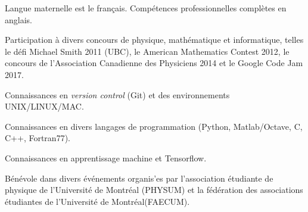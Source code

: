 \begin{cvletter}
{
  \begin{cvitems}
    \item{Langue maternelle est le fran\c{c}ais. Comp\'etences professionnelles compl\`etes en anglais.}
    \item{Participation \`a divers concours de physique, math\'ematique et informatique, telles le d\'efi Michael Smith 2011 (UBC), le American Mathematics Contest 2012, le concours de l'Association Canadienne des Physiciens 2014 et le Google Code Jam 2017.}
    \item{Connaissances en \textit{version control} (Git) et des environnements UNIX/LINUX/MAC.}
    \item{Connaissances en divers langages de programmation (Python, Matlab/Octave, C, C++, Fortran77).}
    \item{Connaissances en apprentissage machine et Tensorflow.}
    \item{B\'en\'evole dans divers \'ev\'enements organis'es par l'association \'etudiante de physique de l'Universit\'e de Montr\'eal (PHYSUM) et la f\'ed\'eration des associations \'etudiantes de l'Universit\'e de Montr\'eal(FAECUM).}
  \end{cvitems}
 }
\end{cvletter}
